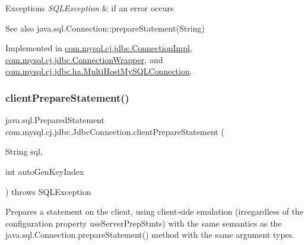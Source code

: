 \begin{DoxyExceptions}{Exceptions}
{\em S\+Q\+L\+Exception} & if an error occurs \\
\hline
\end{DoxyExceptions}
\begin{DoxySeeAlso}{See also}
java.\+sql.\+Connection\+::prepare\+Statement(\+String) 
\end{DoxySeeAlso}


Implemented in \mbox{\hyperlink{classcom_1_1mysql_1_1cj_1_1jdbc_1_1_connection_impl_a97fe5e29bb844493eb31b4f1c48d8bc7}{com.\+mysql.\+cj.\+jdbc.\+Connection\+Impl}}, \mbox{\hyperlink{classcom_1_1mysql_1_1cj_1_1jdbc_1_1_connection_wrapper_abec439c58b0b01c1590be391a2d1969a}{com.\+mysql.\+cj.\+jdbc.\+Connection\+Wrapper}}, and \mbox{\hyperlink{classcom_1_1mysql_1_1cj_1_1jdbc_1_1ha_1_1_multi_host_my_s_q_l_connection_aad5b9594841a4c935130b225d0c3d686}{com.\+mysql.\+cj.\+jdbc.\+ha.\+Multi\+Host\+My\+S\+Q\+L\+Connection}}.

\mbox{\label{interfacecom_1_1mysql_1_1cj_1_1jdbc_1_1_jdbc_connection_a1d01e4f2fd60084794906cc9a1c24c24}} 
\subsubsection{\texorpdfstring{client\+Prepare\+Statement()}{clientPrepareStatement()}\hspace{0.1cm}{\footnotesize\ttfamily [2/6]}}
{\footnotesize\ttfamily java.\+sql.\+Prepared\+Statement com.\+mysql.\+cj.\+jdbc.\+Jdbc\+Connection.\+client\+Prepare\+Statement (\begin{DoxyParamCaption}\item[{String}]{sql,  }\item[{int}]{auto\+Gen\+Key\+Index }\end{DoxyParamCaption}) throws S\+Q\+L\+Exception}

Prepares a statement on the client, using client-\/side emulation (irregardless of the configuration property \textquotesingle{}use\+Server\+Prep\+Stmts\textquotesingle{}) with the same semantics as the java.\+sql.\+Connection.\+prepare\+Statement() method with the same argument types.



